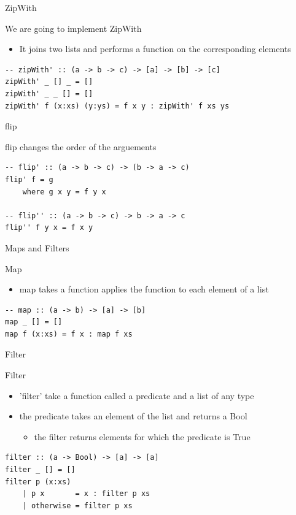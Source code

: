\documentclass[presetation]{beamer}
\begin{document}
\begin{frame}[fragile,label={sec:org4f101ee}]{ZipWith}
 \begin{block}{We are going to implement ZipWith}
\begin{itemize}
\item It joins two lists and performs a function on the corresponding elements
\end{itemize}
\begin{verbatim}
-- zipWith' :: (a -> b -> c) -> [a] -> [b] -> [c]
zipWith' _ [] _ = []
zipWith' _ _ [] = []
zipWith' f (x:xs) (y:ys) = f x y : zipWith' f xs ys
\end{verbatim}
\end{block}
\end{frame}

\begin{frame}[fragile,label={sec:org05453c1}]{flip}
 \begin{block}{flip changes the order of the arguements}
\begin{verbatim}
-- flip' :: (a -> b -> c) -> (b -> a -> c)
flip' f = g
    where g x y = f y x

-- flip'' :: (a -> b -> c) -> b -> a -> c
flip'' f y x = f x y
\end{verbatim}
\end{block}
\end{frame}

\begin{frame}[fragile,label={sec:orgced0ebc}]{Maps and Filters}
 \begin{block}{Map}
\begin{itemize}
\item map takes a function applies the function to each element of a list
\end{itemize}
\begin{verbatim}
-- map :: (a -> b) -> [a] -> [b]
map _ [] = []
map f (x:xs) = f x : map f xs
\end{verbatim}
\end{block}
\end{frame}

\begin{frame}[fragile,label={sec:org2c3db7f}]{Filter}
 \begin{block}{Filter}
\begin{itemize}
\item 'filter' take a function called a predicate and a list of any type
\item the predicate takes an element of the list and returns a Bool
\begin{itemize}
\item the filter returns elements for which the predicate is True
\end{itemize}
\end{itemize}
\begin{verbatim}
filter :: (a -> Bool) -> [a] -> [a]
filter _ [] = []
filter p (x:xs) 
    | p x       = x : filter p xs
    | otherwise = filter p xs
\end{verbatim}
\end{block}
\end{frame}
\end{document}
